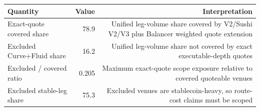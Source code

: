 \begin{tabular}{lrr}
\toprule
Quantity & Value & Interpretation \\
\midrule
Exact-quote covered share & 78.9 & Unified leg-volume share covered by V2/Sushi V2/V3 plus Balancer weighted quote extension \\
Excluded Curve+Fluid share & 16.2 & Unified leg-volume share not covered by exact executable-depth quotes \\
Excluded / covered ratio & 0.205 & Maximum exact-quote scope exposure relative to covered quoteable venues \\
Excluded stable-leg share & 75.3 & Excluded venues are stablecoin-heavy, so route-cost claims must be scoped \\
\bottomrule
\end{tabular}
